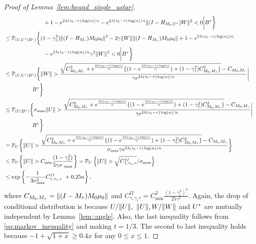 \documentclass[10pt,a4paper]{amsart}
\def\P{\mathbb P}
\begin{document}
\begin{proof}[Proof of Lemma~\ref{lem:bound_single_ustar}]
\begin{align*}
    & \quad  \qquad  \qquad \qquad   +1 -e^{2\lambda(\tau_0-\tau)\log(n)/n} - e^{2\lambda(\tau_0-\tau)\log(n)/n} \|(\*I-\*H_{\*M_0, \*U^*})\*W\|^2  < 0 \bigg|  B^*\bigg\}\\
           & \leq \P_{(\*U, \*U^*|B^*)}\bigg\{(1 - \gamma^2_1)\|(\*I-\*H_{\*M_\tau})\*M_0 \*\mu_0\|^2  - 2 \gamma\|\*W\| \|(\*I-\*H_{\*M_\tau})\*M_0 \*\mu_0\|  +1 -e^{2\lambda(\tau_0-\tau)\log(n)/n} \\
    & \quad  \qquad  \qquad \qquad   - e^{2\lambda(\tau_0-\tau)\log(n)/n} \gamma^2\|\*W\|^2  < 0 \bigg| B^*\bigg\}\\
     & \leq \P_{(\*U, \*U^*|B^*)}\bigg\{{\|\*W\| }  > 
     \frac{ \sqrt{ C^2_{\*M_0, \*M_\tau}  +e^{\frac{2\lambda(\tau_0-\tau)\log(n)}{n}} \{(1- e^{\frac{2\lambda(\tau_0-\tau)\log(n)}{n}} )+ (1- \gamma_1^2) C^2_{\*M_0, \*M_\tau}\}   } -C_{\*M_0, \*M_\tau} }{\gamma e^{2\lambda(\tau_0-\tau)\log(n)/n} }\bigg | \\
        & \quad  \qquad  \qquad B^* \bigg\}\\
      &  \leq \P_{(\*U|B^*)}\bigg\{{\sigma_{\max} \|\*U\| }  > 
     \frac{ \sqrt{ C^2_{\*M_0, \*M_\tau}  +e^{\frac{2\lambda(\tau_0-\tau)\log(n)}{n}} \{(1- e^{\frac{2\lambda(\tau_0-\tau)\log(n)}{n}} )+ (1- \gamma_1^2) C^2_{\*M_0, \*M_\tau}\}   } -C_{\*M_0, \*M_\tau} }{\gamma e^{2\lambda(\tau_0-\tau)\log(n)/n} }\bigg | \\
        & \quad  \qquad  \qquad B^* \bigg\}\\
        & =  \P_{\*U}\bigg\{{\|\*U\|}  >  \frac{ \sqrt{ C^2_{\*M_0, \*M_\tau}  +e^{\frac{2\lambda(\tau_0-\tau)\log(n)}{n}} \{(1- e^{\frac{2\lambda(\tau_0-\tau)\log(n)}{n}} )+ (1- \gamma_1^2) C^2_{\*M_0, \*M_\tau}\}   } -C_{\*M_0, \*M_\tau} }{\sigma_{\max}\gamma e^{2\lambda(\tau_0-\tau)\log(n)/n} } \bigg\}\\
     & \leq \P_{\*U}\bigg\{\|\*U\| > C_{\min} \frac{(1-\gamma_1^2)}{5\gamma\sigma_{\
     \max}}\bigg\} = \P_{\*U}\left\{\|\*U\|  >  \sqrt{C^{II}_{\gamma,\gamma_1,\tau}}/\sigma_{\max}\right\}\\
     & \leq \exp\left\{-\frac{1}{3\sigma^2_{\max}} C^{II}_{\gamma, \gamma_1, \tau}\ + 0.25n \right\}, 
\end{align*}
where $C_{\*M_0, \*M_\tau} = \|(\*I - \*M_\tau)\*M_0\*\mu_0\|$  and $ C^{II}_{\gamma, \gamma_1 \tau} =  C^2_{\min} \frac{(1-\gamma_1^2)^2}{25\gamma^2}$. Again, the 
 drop of conditional distribution is because $\*U/\|\*U\|,$ $\|\*U\|, \*W/\|\*W\|$ and $\*U^*$ are mutually independent by Lemma~\ref{lem::angle}. 
  Also, the last inequality follows from \eqref{eq:markov_ineuqality} and making $t = 1/3.$ The second to last inequality holds because $-1+\sqrt{1+x} \geq 0.4x$ for any $0 \leq x \leq 1.$ 



\end{proof}
\end{document}
